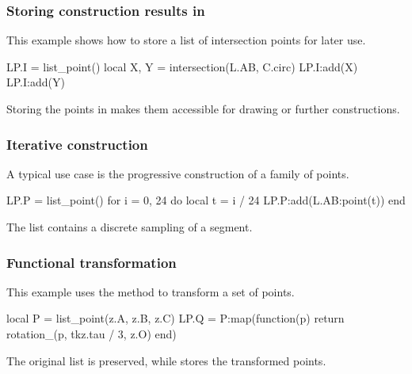 \subsubsection{Storing construction results in }
\label{ssub:list_point_example_lp}

This example shows how to store a list of intersection points for later use.

\begin{tkzexample}
LP.I = list_point()
local X, Y = intersection(L.AB, C.circ)
LP.I:add(X)
LP.I:add(Y)
\end{tkzexample}

Storing the points in  makes them accessible for drawing
or further constructions.

\subsubsection{Iterative construction}
\label{ssub:list_point_example_iterative}

A typical use case is the progressive construction of a family of points.

\begin{tkzexample}
LP.P = list_point()
for i = 0, 24 do
  local t = i / 24
  LP.P:add(L.AB:point(t))
end
\end{tkzexample}

The list  contains a discrete sampling of a segment.

\subsubsection{Functional transformation}
\label{ssub:list_point_example_map}

This example uses the  method to transform a set of points.

\begin{tkzexample}
local P = list_point(z.A, z.B, z.C)
LP.Q = P:map(function(p)
  return rotation_(p, tkz.tau / 3, z.O)
end)
\end{tkzexample}

The original list  is preserved, while  stores the transformed points.

